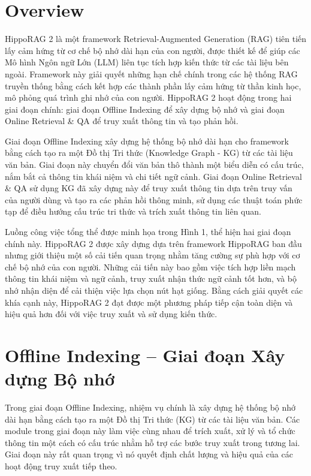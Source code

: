 \documentclass[../main.tex]{subfiles}
\begin{document}
\section{Overview}
HippoRAG 2 là một framework Retrieval-Augmented Generation (RAG) tiên tiến lấy cảm hứng từ cơ chế bộ nhớ dài hạn của con người, được thiết kế để giúp các Mô hình Ngôn ngữ Lớn (LLM) liên tục tích hợp kiến thức từ các tài liệu bên ngoài. Framework này giải quyết những hạn chế chính trong các hệ thống RAG truyền thống bằng cách kết hợp các thành phần lấy cảm hứng từ thần kinh học, mô phỏng quá trình ghi nhớ của con người. HippoRAG 2 hoạt động trong hai giai đoạn chính: giai đoạn Offline Indexing để xây dựng bộ nhớ và giai đoạn Online Retrieval \& QA để truy xuất thông tin và tạo phản hồi.

Giai đoạn Offline Indexing xây dựng hệ thống bộ nhớ dài hạn cho framework bằng cách tạo ra một Đồ thị Tri thức (Knowledge Graph - KG) từ các tài liệu văn bản. Giai đoạn này chuyển đổi văn bản thô thành một biểu diễn có cấu trúc, nắm bắt cả thông tin khái niệm và chi tiết ngữ cảnh. Giai đoạn Online Retrieval \& QA sử dụng KG đã xây dựng này để truy xuất thông tin dựa trên truy vấn của người dùng và tạo ra các phản hồi thông minh, sử dụng các thuật toán phức tạp để điều hướng cấu trúc tri thức và trích xuất thông tin liên quan.

Luồng công việc tổng thể được minh họa trong Hình 1, thể hiện hai giai đoạn chính này. HippoRAG 2 được xây dựng dựa trên framework HippoRAG ban đầu nhưng giới thiệu một số cải tiến quan trọng nhằm tăng cường sự phù hợp với cơ chế bộ nhớ của con người. Những cải tiến này bao gồm việc tích hợp liền mạch thông tin khái niệm và ngữ cảnh, truy xuất nhận thức ngữ cảnh tốt hơn, và bộ nhớ nhận diện để cải thiện việc lựa chọn nút hạt giống. Bằng cách giải quyết các khía cạnh này, HippoRAG 2 đạt được một phương pháp tiếp cận toàn diện và hiệu quả hơn đối với việc truy xuất và sử dụng kiến thức.

\section{Offline Indexing – Giai đoạn Xây dựng Bộ nhớ}
Trong giai đoạn Offline Indexing, nhiệm vụ chính là xây dựng hệ thống bộ nhớ dài hạn bằng cách tạo ra một Đồ thị Tri thức (KG) từ các tài liệu văn bản. Các module trong giai đoạn này làm việc cùng nhau để trích xuất, xử lý và tổ chức thông tin một cách có cấu trúc nhằm hỗ trợ các bước truy xuất trong tương lai. Giai đoạn này rất quan trọng vì nó quyết định chất lượng và hiệu quả của các hoạt động truy xuất tiếp theo.
\end{document}
